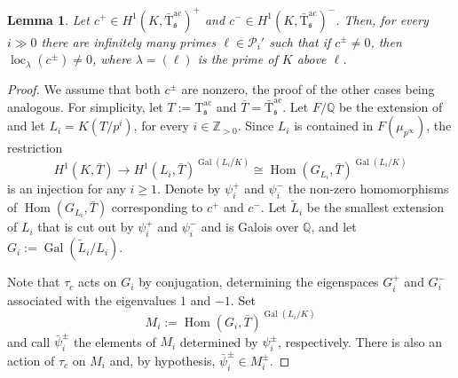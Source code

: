 \documentclass[12pt,reqno]{amsart}
\newtheorem{lemma}[theorem]{Lemma}
\theoremstyle{definition}
\theoremstyle{remark}
\newcommand{\numberset}{\mathbb}
\newcommand{\Q}{\numberset{Q}}
\newcommand{\Z}{\numberset{Z}}
\newcommand{\T}{\boldsymbol{\mathrm{T}}}
\DeclareMathOperator{\Hom}{Hom}
\DeclareMathOperator{\Gal}{Gal}
\DeclareMathOperator{\loc}{loc}
\newcommand{\ac}{\mathrm{ac}}
\newcommand{\gl}{\lambda}
\newcommand{\sfrak}{\mathfrak{s}}
\begin{document}
\begin{lemma}\label{lem:playing-with-primes}
     Let $c^+\in H^1(K,\bar{\T}^\ac_\sfrak)^+$ and $c^-\in H^1(K,\bar{\T}^\ac_\sfrak)^-$. Then, for every $i\gg 0$ there are infinitely many primes $\ell\in\mathcal{P}_i'$ such that if $c^\pm \ne 0$, then $\loc_\gl(c^{\pm})\ne 0$, where $\gl=(\ell)$ is the prime of $K$ above $\ell$.
\end{lemma}
\begin{proof}
    We assume that both $c^\pm$ are nonzero, the proof of the other cases being analogous. For simplicity, let $T:=\T^\ac_\sfrak$ and $\bar{T}=\bar{\T}^\ac_\sfrak$. Let $F/\Q$ be the extension of \cite[Hypothesis H.2]{Howard04:heegner-point-kolyvagin-system} and let $L_i = K(T/p^i)$, for every $i\in\Z_{>0}$. Since $L_i$ is contained in $F(\mu_{p^{\infty}})$, the restriction
    \begin{equation*}
        H^1(K,\bar{T})\to H^1(L_i,\bar{T})^{\Gal(L_i/K)}\cong\Hom(G_{L_i},\bar{T})^{\Gal(L_i/K)}
    \end{equation*}
    is an injection for any $i\ge1$. Denote by $\psi_i^+$ and $\psi_i^-$ the non-zero homomorphisms of $\Hom(G_{L_i},\bar{T})$ corresponding to $c^+$ and $c^-$. Let $\tilde{L}_i$ be the smallest extension of $L_i$ that is cut out by $\psi_i^+$ and $\psi_i^-$ and is Galois over $\Q$, and let $G_i:=\Gal(\tilde{L}_i/L_i)$.

     Note that $\tau_c$ acts on $G_i$ by conjugation, determining the eigenspaces $G_i^+$ and $G_i^-$ associated with the eigenvalues $1$ and $-1$. Set
    \begin{equation*}
        M_i:=\Hom(G_i,\bar{T})^{\Gal(L_i/K)}
    \end{equation*}
    and call $\bar{\psi}_i^{\pm}$ the elements of $M_i$ determined by $\psi_i^{\pm}$, respectively. There is also an action of $\tau_c$ on $M_i$ and, by hypothesis, $\bar{\psi}_i^{\pm}\in M_i^{\pm}$.


\end{proof}
\end{document}
